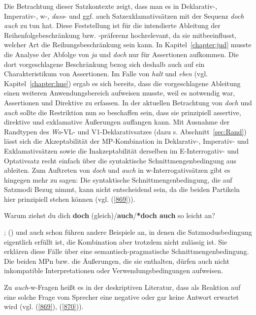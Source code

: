 {Die Betrachtung dieser Satzkontexte zeigt, dass man es in Deklarativ-, Impera\-tiv-, w-, \textit{dass}- und ggf. auch Satzexklamativsätzen mit der Sequenz \textit{doch auch} zu tun hat. Diese Feststellung ist für die intendierte Ableitung der Reihenfolgebe\-schränkung bzw. -präferenz hochrelevant, da sie mitbeeinflusst, welcher Art die Reihungsbeschränkung sein kann. In Kapitel~\ref{chapter:jud} musste die Analyse der Abfolge von \textit{ja} und \textit{doch} nur für Assertionen aufkommen. Die dort vorgeschlagene Beschränkung bezog sich deshalb auch auf ein Charakteristikum von Assertionen. Im Falle von \textit{halt} und \textit{eben} (vgl. Kapitel~\ref{chapter:hue}) ergab es sich bereits, dass die vorgeschlagene Ableitung einen weiteren Anwendungsbereich aufweisen musste, weil es notwen\-dig war, Assertionen und Direktive zu erfassen. In der aktuellen Betrachtung von \textit{doch} und \textit{auch} sollte die Restriktion nun so beschaffen sein, dass sie prinzipiell assertive, direktive und exklamative Äußerungen auffangen kann. Mit Ausnahme der Randtypen des  \textit{Wo}-VL- und V1-Deklarativsatzes  (dazu s. Abschnitt~\ref{sec:Rand}) lässt sich die Akzeptabilität der MP-Kombination in Deklarativ-, Impe\-rativ- und Ex\-klamativsätzen sowie die Inakzeptabilität derselben im E-Interrogativ- und Optativsatz recht einfach über die syntaktische Schnittmengenbedingung aus \citet{Thurmair1989, Thurmair1991} ableiten. Zum Auftreten von \textit{doch} und \textit{auch} in w-Interroga\-tivsätzen gibt es hingegen mehr zu sagen: Die syntaktische Schnittmengenbedingung, die auf Satzmodi Bezug nimmt, kann nicht entscheidend sein, da die beiden Partikeln hier prinzipiell stehen können (vgl. (\ref{869})).

\begin{exe}
\ex\label{869}
Warum ziehst du dich \textbf{doch} (gleich)/\textbf{auch}/\textbf{*doch auch} so leicht an?
\end{exe}	
\citet[281]{Thurmair1989}; (\citeyear[27]{Thurmair1991}) und auch schon \citet[218, 222, 224-225]{Dahl1988} führen andere Beispiele an, in denen die Satzmodusbedingung eigentlich erfüllt ist, die Kombination aber trotzdem nicht zulässig ist. Sie erklären diese Fälle über eine semantisch-pragmatische Schnittmengenbedingung. Die beiden MPn bzw. die Äußerungen, die sie enthalten, dürfen auch nicht inkompatible Interpretationen oder Verwendungsbedingungen aufweisen. 	
	
Zu \textit{auch}-w-Fragen heißt es in der deskriptiven Literatur, dass als Reaktion auf eine solche Frage vom Sprecher eine negative oder gar keine Antwort erwartet wird (vgl. (\ref{869}), (\ref{870})). 

}
